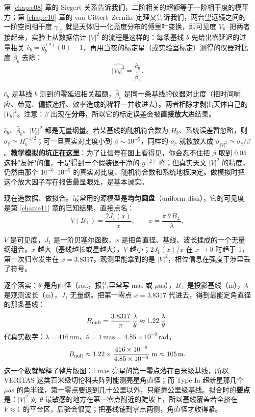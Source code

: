 第 \ref{chap:e08} 章的 Siegert 关系告诉我们，二阶相关的超额等于一阶相干度的模平方；第 \ref{chap:e10} 章的 van Cittert--Zernike 定理又告诉我们，两台望远镜之间的一阶空间相干度 \(\gamma_{12}\) 就是天体归一化亮度分布的傅里叶变换，即可见度 \(V\)。把两者接起来，实验上从数据估计 \(|V|^2\) 的流程是这样的：每条基线 \(b\) 先给出零延迟的过量相关 \(\hat c_b=\hat g^{(2)}_b(0)-1\)，再用当夜的标定星（或实验室标定）测得的仪器对比度 \(\hat\beta_b\) 去除：
\begin{equation}
  \widehat{|V_b|^2}=\frac{\hat c_b}{\hat\beta_b}.
  \label{eq:e26-v2-estimator}
\end{equation}
\begin{formulaexplain}
\(\hat c_b\) 是基线 \(b\) 测到的零延迟相关超额，\(\hat\beta_b\) 是同一条基线的仪器对比度（把时间响应、带宽、偏振选择、效率造成的稀释一并收进去）。两者相除才剥出天体自己的 \(|V_b|^2\)。注意：\(\beta\) 出现在\textbf{分母}，所以它的标定误差会被\textbf{直接放大}进结果。
\end{formulaexplain}
\(\hat c_b\)、\(\hat\beta_b\)、\(|V_b|^2\) 都是无量纲量。若某基线的随机符合数为 \(H_b\)、系统误差暂忽略，则 \(\sigma_{\hat c}\simeq H_b^{-1/2}\)；可一旦真实对比度小到 \(\beta\sim10^{-5}\)，同样的 \(\sigma_{\hat c}\) 就被放大成 \(\sigma_{|V|^2}\simeq\sigma_{\hat c}/\beta\)。\textbf{教学模拟的坑正在这里}：为了让信号在图上看得见，你会忍不住把 \(\beta\) 取到 \(0.05\) 这种"友好"的值，于是得到一个假装很干净的 \(g^{(2)}\) 峰；但真实天文 \(|V|^2\) 的精度，仍然由那个 \(10^{-6}\)–\(10^{-5}\) 的真实对比度、随机符合数和系统地板决定。做模拟时把这个放大因子写在报告最显眼处，是基本诚实。

现在造数据、做拟合。最常用的源模型是\textbf{均匀圆盘}（uniform disk），它的可见度是第 \ref{chap:e11} 章的已知结果，直接点名：
\begin{equation}
  V(B_\perp)=\frac{2J_1(x)}{x},\qquad
  x=\frac{\pi\,\theta\,B_\perp}{\lambda},
  \label{eq:e26-uniform-disk}
\end{equation}
\begin{formulaexplain}
\(V\) 是可见度，\(J_1\) 是一阶贝塞尔函数，\(x\) 是把角直径、基线、波长揉成的一个无量纲组合。\(x\) 越大（基线越长或星越大），\(V\) 越小；\(2J_1(x)/x\) 在 \(x\to0\) 时趋于 1，第一次归零发生在 \(x=3.8317\)。观测里能拿到的是 \(|V|^2\)，相位信息在强度干涉里丢了符号。
\end{formulaexplain}
逐个落实：\(\theta\) 是角直径（rad，报告里常写 mas 或 \(\mu\mathrm{as}\)），\(B_\perp\) 是投影基线（m），\(\lambda\) 是观测波长（m），\(J_1\) 无量纲。把第一零点 \(x=3.8317\) 代进去，得到最能定角直径的那条基线：
\[
  B_{\rm null}=\frac{3.8317}{\pi}\,\frac{\lambda}{\theta}\approx1.22\,\frac{\lambda}{\theta}.
\]
代真实数字：\(\lambda=416\,\mathrm{nm}\)、\(\theta=1\,\mathrm{mas}=4.85\times10^{-9}\,\mathrm{rad}\)，
\[
  B_{\rm null}\approx1.22\times\frac{416\times10^{-9}}{4.85\times10^{-9}}\ \mathrm{m}\approx105\,\mathrm{m}.
\]
这一个数就解释了整片版图：\(1\,\mathrm{mas}\) 亮星的第一零点落在百米级基线，所以 VERITAS 这类百米级切伦科夫阵列能测亮星角直径；而 Type Ia 超新星那几个 \(\mu\mathrm{as}\) 的角半径，第一零点要退到几十公里以外，只能靠公里级基线。拟合时的\textbf{要点}是：\(|V|^2\) 对 \(\theta\) 最敏感的地方在第一零点附近的陡坡上，所以基线覆盖若全挤在 \(V\approx1\) 的平台区，后验会很宽；把基线铺到零点两侧，角直径才收得紧。

